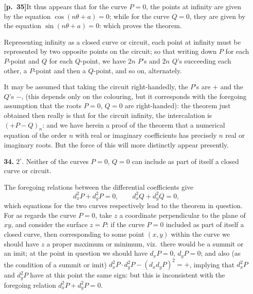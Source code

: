 \documentclass[11pt,a4paper]{article}
\begin{document}
\bigskip

\noindent\textbf{[p.~35]}\quad It thus appears that for the curve $P=0$, the points at infinity are given by the equation $\cos(n\theta + a) = 0$; while for the curve $Q=0$, they are given by the equation $\sin(n\theta + a) = 0$: which proves the theorem.

Representing infinity as a closed curve or circuit, each point at infinity must be represented by two opposite points on the circuit; so that writing down $P$ for each $P$-point and $Q$ for each $Q$-point, we have $2n$ $P$'s and $2n$ $Q$'s succeeding each other, a $P$-point and then a $Q$-point, and so on, alternately.

It may be assumed that taking the circuit right-handedly, the $P$'s are $+$ and the $Q$'s $-$, (this depends only on the colouring, but it corresponds with the foregoing assumption that the roots $P=0$, $Q=0$ are right-handed): the theorem just obtained then really is that for the circuit infinity, the intercalation is $(+P-Q)_{n}$: and we have herein a proof of the theorem that a numerical equation of the order $n$ with real or imaginary coefficients has precisely $n$ real or imaginary roots. But the force of this will more distinctly appear presently.

\medskip

\noindent\textbf{34.} $2^{\circ}$. Neither of the curves $P=0$, $Q=0$ can include as part of itself a closed curve or circuit.

The foregoing relations between the differential coefficients give
\[
d_{x}^{2}P + d_{y}^{2}P = 0,\qquad d_{x}^{2}Q + d_{y}^{2}Q = 0,
\]
which equations for the two curves respectively lead to the theorem in question. For as regards the curve $P=0$, take $z$ a coordinate perpendicular to the plane of $xy$, and consider the surface $z = P$: if the curve $P=0$ included as part of itself a closed curve, then corresponding to some point $(x,y)$ within the curve we should have $z$ a proper maximum or minimum, viz.\ there would be a summit or an imit; at the point in question we should have $d_{x}P = 0$, $d_{y}P = 0$; and also (as the condition of a summit or imit) $d_{x}^{2}P\cdot d_{y}^{2}P - (d_{x}d_{y}P)^{2} = +$, implying that $d_{x}^{2}P$ and $d_{y}^{2}P$ have at this point the same sign: but this is inconsistent with the foregoing relation $d_{x}^{2}P + d_{y}^{2}P = 0$.

\medskip
\end{document}
